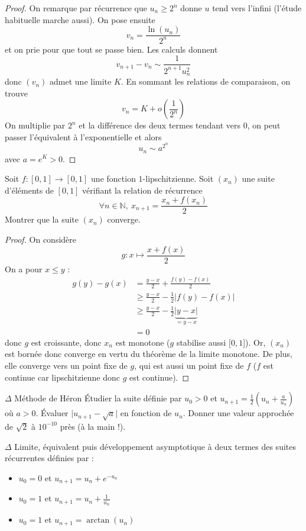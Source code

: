 \documentclass[french,a4paper]{article}
\newcommand{\N}{\mathbb{N}}
\theoremstyle{plain}
\theoremstyle{definition}
\theoremstyle{remark}
\begin{document}
\begin{proof}
	On remarque par récurrence que $u_n\geqslant 2^n$ donne $u$ tend vers l'infini (l'étude habituelle marche aussi). On pose ensuite $$v_n=\frac{\ln(u_n)}{2^n}$$ et on prie pour que tout se passe bien. Les calculs donnent $$v_{n+1}-v_n\sim\frac{1}{2^{n+1}u_n^2}$$ donc $(v_n)$ admet une limite $K$. En sommant les relations de comparaison, on trouve $$v_n=K+o\left(\frac{1}{2^n}\right)$$ On multiplie par $2^n$ et la différence des deux termes tendant vers $0$, on peut passer l'équivalent à l'exponentielle et alors $$u_n\sim a^{2^n}$$ avec $a=e^K>0$.
\end{proof}

\begin{ex}[Moulin.58]{}
	Soit $f:[0,1]\to[0,1]$ une fonction $1$-lipschitzienne. Soit $(x_n)$ une suite d'éléments de $[0,1]$ vérifiant la relation de récurrence $$\forall n\in\N,\ x_{n+1}=\frac{x_n+f(x_n)}{2}$$ Montrer que la suite $(x_n)$ converge.
\end{ex}

\begin{proof}
	On considère $$g:x\mapsto\frac{x+f(x)}{2}$$ On a pour $x\leqslant y$ : \begin{align*}
		g(y)-g(x)&=\frac{y-x}{2}+\frac{f(y)-f(x)}{2} \\
		&\geqslant \frac{y-x}{2}-\frac{1}{2}\lvert f(y)-f(x)\rvert \\
		&\geqslant\frac{y-x}{2}-\frac{1}{2}\underbrace{\lvert y-x\rvert}_{=y-x}\\
		&=0
	\end{align*} donc $g$ est croissante, donc $x_n$ est monotone ($g$ stabilise aussi $[0,1$]). Or, $(x_n)$ est bornée donc converge en vertu du théorème de la limite monotone. De plus, elle converge vers un point fixe de $g$, qui est aussi un point fixe de $f$ ($f$ est continue car lipschitzienne donc $g$ est continue).
\end{proof}

\begin{ex}[Moulin.59]{$\Delta$ Méthode de Héron}
	Étudier la suite définie par $u_0>0$ et $u_{n+1}=\displaystyle\frac{1}{2}\left(u_n+\frac{a}{u_n}\right)$ où $a>0$. Évaluer $\lvert u_{n+1}-\sqrt{a}\rvert$ en fonction de $u_n$. Donner une valeur approchée de $\sqrt{2}$ à $10^{-10}$ près (à la main !).
\end{ex}

\begin{ex}[Moulin.60]{$\Delta$}
	Limite, équivalent puis développement asymptotique à deux termes des suites récurrentes définies par :
	\begin{itemize}
		\item $u_0=0$ et $u_{n+1}=u_n+e^{-u_n}$
		\item $u_0=1$ et $u_{n+1}=u_n+\displaystyle\frac{1}{u_n}$
		\item $u_0=1$ et $u_{n+1}=\arctan(u_n)$
	\end{itemize}
\end{ex}
\end{document}
